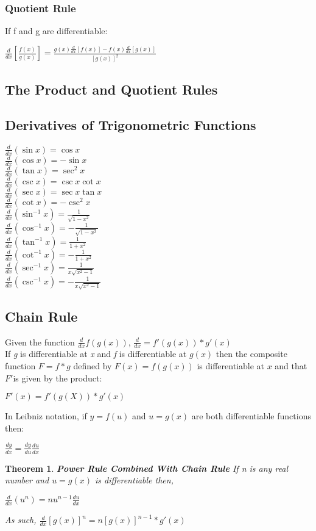 \documentclass[10pt,a4paper]{article}
\newtheorem{theorem}{Theorem}
\begin{document}
		\subsubsection{Quotient Rule}
		If f and g are differentiable:
		\begin{center}
			$\frac{d}{dx}[\frac{f(x)}{g(x)}] = \frac{g(x)\frac{d}{dx}[f(x)]-f(x)\frac{d}{dx}[g(x)]}{[g(x)]^{2}}$
		\end{center}
		\subsection{The Product and Quotient Rules}
		\subsection{Derivatives of Trigonometric Functions}
			$\frac{d}{dx}(\sin{x}) = \cos{x}$
		\\	$\frac{d}{dx}(\cos{x}) = -\sin{x}$
		\\	$\frac{d}{dx}(\tan{x}) = \sec^{2}{x}$
		\\	$\frac{d}{dx}(\csc{x}) = \csc{x}\cot{x}$
		\\	$\frac{d}{dx}(\sec{x})= \sec{x}\tan{x}$
		\\	$\frac{d}{dx}(\cot{x}) = -\csc^{2}{x}$
		\\	$\frac{d}{dx}(\sin^{-1}{x}) = \frac{1}{\sqrt{1-x^{2}}}$
		\\	$\frac{d}{dx}(\cos^{-1}{x}) = -\frac{1}{\sqrt{1-x^{2}}}$
		\\	$\frac{d}{dx}(\tan^{-1}{x}) = \frac{1}{1+x^{2}}$
		\\ $\frac{d}{dx}(\cot^{-1}{x}) = -\frac{1}{1+x^{2}}$
		\\ $\frac{d}{dx}(\sec^{-1}{x}) = \frac{1}{x\sqrt{x^{2}-1}}$
		\\ $\frac{d}{dx}(\csc^{-1}{x}) = -\frac{1}{x\sqrt{x^{2}-1}}$

	
	\subsection{Chain Rule}
		Given the function $\frac{d}{dx}f(g(x))$, $ \frac{d}{dx} = f'(g(x))*g'(x)$
\\		If \textit{g} is differentiable at \textit{x} and \textit{f} is differentiable at $g(x)$ then the composite function $F = f*g$ defined by $F(x) = f(g(x))$ is differentiable at $x$ and that $F'$is given by the product:
		\begin{center}
			$F'(x) = f'(g(X)) * g'(x)$	
		\end{center}
		In Leibniz notation, if $y=f(u)$ and $u=g(x)$ are both differentiable functions then:
		\begin{center}
			$\frac{dy}{dx} = \frac{dy}{du}\frac{du}{dx}$
		\end{center}
		\begin{theorem}
			\textbf{Power Rule Combined With Chain Rule} If \textit{n} is any real number and $u=g(x)$ is differentiable then,
			\begin{center}
				$\frac{d}{dx}(u^{n}) = nu^{n-1}\frac{du}{dx}$
			\end{center}
			As such, $\frac{d}{dx}[g(x)]^{n} = n[g(x)]^{n-1} * g'(x)$
		\end{theorem}
\end{document}
